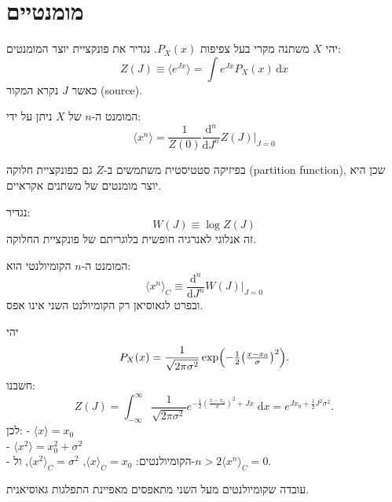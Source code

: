 \documentclass{tstextbook}
\begin{document}
\section{מומנטיים}

\begin{definition}
יהי \(X\) משתנה מקרי בעל צפיפות \(P_X(x)\). נגדיר את פונקציית יוצר המומנטים:
$$Z(J) \equiv \langle e^{J x}\rangle = \int e^{J x} P_X(x)\,\mathrm{d}x$$
כאשר \(J\) נקרא המקור (source).

\end{definition}
\begin{proposition}
המומנט ה-\(n\) של \(X\) ניתן על ידי:
$$\langle x^n \rangle = \frac{1}{Z(0)} \frac{\mathrm{d}^n}{\mathrm{d}J^n} Z(J) \Big|_{J=0}$$

\end{proposition}
\begin{remark}
בפיזיקה סטטיסטית משתמשים ב-\(Z\) גם כפונקציית חלוקה (partition function), שכן היא יוצר מומנטים של משתנים אקראיים.

\end{remark}
\begin{definition}[קומיולנט]
נגדיר:
$$W(J) \equiv \log Z(J)
$$
זה אנלוגי לאנרגיה חופשית בלוגריתם של פונקציית החלוקה.

\end{definition}
\begin{proposition}
המומנט ה-\(n\) הקומיולנטי הוא:
$$\langle x^n \rangle_C \equiv \frac{\mathrm{d}^n}{\mathrm{d}J^n} W(J)\Big|_{J=0}
$$
ובפרט לגאוסיאן רק הקומיולנט השני אינו אפס.

\end{proposition}
\begin{example}
יהי
$$P_X(x) = \frac{1}{\sqrt{2\pi\sigma^2}} \exp\Bigl(-\tfrac{1}{2}\bigl(\tfrac{x-x_0}{\sigma}\bigr)^2\Bigr).
$$
חשבנו:
$$Z(J) = \int_{-\infty}^{\infty} \frac{1}{\sqrt{2\pi\sigma^2}} e^{ - \tfrac{1}{2}(\frac{x-x_0}{\sigma})^2 + Jx }\;\mathrm{d}x= e^{ J x_0 + \tfrac{1}{2}J^2\sigma^2 }.
$$
לכן:
- \(\langle x\rangle = x_0\)\\

- \(\langle x^2\rangle = x_0^2 + \sigma^2\)\\

- הקומיולנטים: \(\langle x\rangle_C = x_0\), \(\langle x^2\rangle_C = \sigma^2\), ול-\(n>2\)\(\langle x^n\rangle_C=0\).

\end{example}
\begin{remark}
\end{remark}
עובדה שקומיולנטים מעל השני מתאפסים מאפיינת התפלגות גאוסיאנית.
\end{document}
